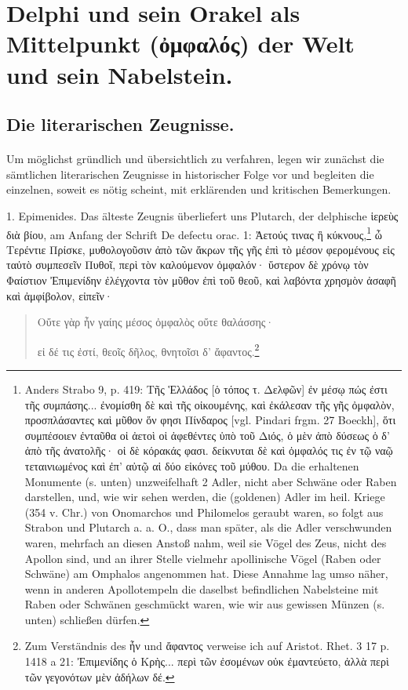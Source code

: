 \documentclass[a4paper, 11pt, oneside]{article}
\begin{document}
\section{Delphi und sein Orakel als Mittelpunkt (ὀμφαλός) der Welt und sein Nabelstein.}
\subsection{Die literarischen Zeugnisse.}
\paragraph{}
Um möglichst gründlich und übersichtlich zu verfahren, legen wir zunächst die sämtlichen literarischen Zeugnisse in historischer Folge vor und begleiten die einzelnen, soweit es nötig scheint, mit erklärenden und kritischen Bemerkungen.

1. Epimenides. Das älteste Zeugnis überliefert uns Plutarch, der delphische ἱερεὺς διὰ βίου, am Anfang der Schrift De defectu orac. 1: Ἀετούς τινας ἢ κύκνους,\footnote{Anders Strabo 9, p. 419: Τῆς Ἑλλάδος [ὁ τόπος τ. Δελφῶν] ἐν μέσῳ πώς ἐστι τῆς συμπάσης... ἐνομίσθη δὲ καὶ τῆς οἰκουμένης, καὶ ἐκάλεσαν τῆς γῆς ὀμφαλὸν, προσπλάσαντες καὶ μῦθον ὅν φησι Πίνδαρος [vgl. Pindari frgm. 27 Boeckh], ὅτι συμπέσοιεν ἐνταῦθα οἱ ἀετοὶ οἱ ἀφεθέντες ὑπὸ τοῦ Διός, ὁ μὲν ἀπὸ δύσεως ὁ δ' ἀπὸ τῆς ἀνατολῆς· οἱ δὲ κόρακάς φασι. δείκνυται δὲ καὶ ὀμφαλός τις ἐν τῷ ναῷ τεταινιωμένος καὶ ἐπ' αὐτῷ αἱ δύο εἰκόνες τοῦ μύθου. Da die erhaltenen Monumente (s. unten) unzweifelhaft 2 Adler, nicht aber Schwäne oder Raben darstellen, und, wie wir sehen werden, die (goldenen) Adler im heil. Kriege (354 v. Chr.) von Onomarchos und Philomelos geraubt waren, so folgt aus Strabon und Plutarch a. a. O., dass man später, als die Adler verschwunden waren, mehrfach an diesen Anstoß nahm, weil sie Vögel des Zeus, nicht des Apollon sind, und an ihrer Stelle vielmehr apollinische Vögel (Raben oder Schwäne) am Omphalos angenommen hat. Diese Annahme lag umso näher, wenn in anderen Apollotempeln die daselbst befindlichen Nabelsteine mit Raben oder Schwänen geschmückt waren, wie wir aus gewissen Münzen (s. unten) schließen dürfen.} ὦ Τερέντιε Πρίσκε, μυθολογοῦσιν ἀπὸ τῶν ἄκρων τῆς γῆς ἐπὶ τὸ μέσον φερομένους εἰς ταὐτὸ συμπεσεῖν Πυθοῖ, περὶ τὸν καλούμενον ὀμφαλόν· ὕστερον δὲ χρόνῳ τὸν Φαίστιον Ἐπιμενίδην ἐλέγχοντα τὸν μῦθον ἐπὶ τοῦ θεοῦ, καὶ λαβόντα χρησμὸν ἀσαφῆ καὶ ἀμφίβολον, εἰπεῖν·
\begin{quotation}
Οὔτε γὰρ ἦν γαίης μέσος ὀμφαλὸς οὔτε θαλάσσης·

εἰ δέ τις ἐστί, θεοῖς δῆλος, θνητοῖσι δ' ἄφαντος.\footnote{Zum Verständnis des ἦν und ἄφαντος verweise ich auf Aristot. Rhet. 3 17 p. 1418 a 21: Ἐπιμενίδης ὁ Κρὴς... περὶ τῶν ἐσομένων οὐκ ἐμαντεύετο, ἀλλὰ περὶ τῶν γεγονότων μὲν ἀδήλων δέ.}
\end{quotation}
\end{document}
